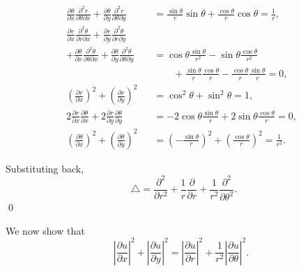 \documentclass[oneside]{article}
\newcommand\abs[1]{\left|#1\right|}
\newcommand*\Laplace{\mathop{}\!\mathbin\bigtriangleup}
\begin{document}
\begin{itemize}
\begin{align*}
  \frac{\partial\theta}{\partial x}
        \frac{\partial^2 r}{\partial\theta\partial x}
        + \frac{\partial\theta}{\partial y}
           \frac{\partial^2 r}{\partial\theta\partial y}
  &= \frac{\sin\theta}{r}\sin\theta + \frac{\cos\theta}{r}\cos\theta
  = \frac{1}{r} \text{,}\\
  \frac{\partial r}{\partial x}
      \frac{\partial^2 \theta}{\partial r\partial x}
    + \frac{\partial r}{\partial y}
      \frac{\partial^2 \theta}{\partial r\partial y} \qquad\\
    + \frac{\partial\theta}{\partial x}
      \frac{\partial^2\theta}{\partial\theta\partial x}
    + \frac{\partial\theta}{\partial y}
      \frac{\partial^2\theta}{\partial\theta\partial y}
  &= \cos\theta\frac{\sin\theta}{r^2} - \sin\theta\frac{\cos\theta}{r^2} \\
  &\qquad+\frac{\sin\theta}{r}\frac{\cos\theta}{r} - \frac{\cos\theta}{r}\frac{\sin\theta}{r} = 0
  \text{,}\\
  \left(\frac{\partial r}{\partial x}\right)^2
       + \left(\frac{\partial r}{\partial y}\right)^2
  &= \cos^2\theta + \sin^2\theta = 1\text{,} \\
  2\frac{\partial r}{\partial x}\frac{\partial\theta}{\partial x}
    + 2\frac{\partial r}{\partial y}\frac{\partial\theta}{\partial y}
  &= -2\cos\theta\frac{\sin\theta}{r} + 2 \sin\theta\frac{\cos\theta}{r} = 0
  \text{,}
  \\
  \left(\frac{\partial\theta}{\partial x}\right)^2
    + \left(\frac{\partial\theta}{\partial y}\right)^2
  &= \left(-\frac{\sin\theta}{r}\right)^2 + \left(\frac{\cos\theta}{r}\right)^2
  = \frac{1}{r^2}\text{.}
\end{align*}

Substituting back,\[
  \Laplace = \frac{\partial^2}{\partial r^2}
             + \frac{1}{r}\frac{\partial}{\partial r}
             + \frac{1}{r^2}\frac{\partial^2}{\partial\theta^2} \text{.}
\] \qed

\end{itemize}

We now show that \[
  \abs{\frac{\partial u}{\partial x}}^2 + \abs{\frac{\partial u}{\partial y}}^2
  = \abs{\frac{\partial u}{\partial r}}^2
  + \frac{1}{r^2}\abs{\frac{\partial u}{\partial\theta}}^2 \text{.}
\]
\end{document}
